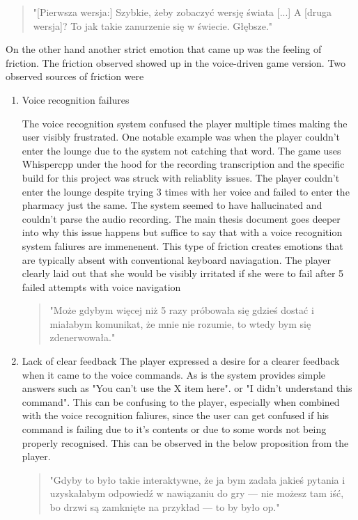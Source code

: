 \begin{quote}
    "[Pierwsza wersja:] Szybkie, żeby zobaczyć wersję świata [...] A [druga wersja]? To jak takie zanurzenie się w świecie. Głębsze."
\end{quote}



On the other hand another strict emotion that came up was the feeling of friction. The friction observed showed up in the voice-driven game version. Two observed sources of friction were 

\begin{enumerate}
    \item Voice recognition failures
    
    The voice recognition system confused the player multiple times making the user visibly frustrated. One notable example was when the player couldn't enter the lounge due to the system not catching that word. The game uses Whispercpp under the hood for the recording transcription and the specific build for this project was struck with reliablity issues. The player couldn't enter the lounge despite trying 3 times with her voice and failed to enter the pharmacy just the same. The system seemed to have hallucinated and couldn't parse the audio recording. The main thesis document goes deeper into why this issue happens but suffice to say that with a voice recognition system faliures are immenenent. This type of friction creates emotions that are typically absent with conventional keyboard naviagation.
    The player clearly laid out that she would be visibly irritated if she were to fail after 5 failed attempts with voice navigation
    \begin{quote}
        "Może gdybym więcej niż 5 razy próbowała się gdzieś dostać i miałabym komunikat, że mnie nie rozumie, to wtedy bym się zdenerwowała."
    \end{quote}

    \item Lack of clear feedback
    The player expressed a desire for a clearer feedback when it came to the voice commands. As is the system provides simple answers such as "You can't use the X item here". or "I didn't understand this command". This can be confusing to the player, especially when combined with the voice recognition faliures, since the user can get confused if his command is failing due to it's contents or due to some words not being properly recognised. This can be observed in the below proposition from the player.
    \begin{quote}
        "Gdyby to było takie interaktywne, że ja bym zadała jakieś pytania i uzyskałabym odpowiedź w nawiązaniu do gry — nie możesz tam iść, bo drzwi są zamknięte na przykład — to by było op."
    \end{quote}
    

\end{enumerate}


